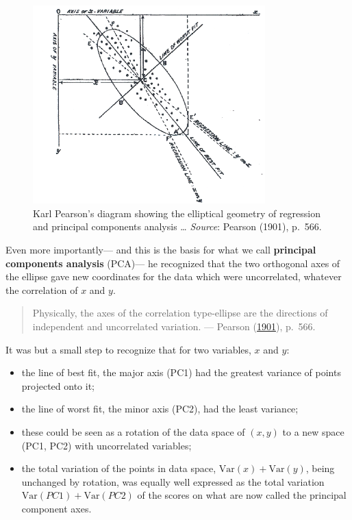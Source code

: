 \documentclass[
  letterpaper,
  10pt,
  krantz2]{krantz}
\providecommand{\tightlist}{%
  \setlength{\itemsep}{0pt}\setlength{\parskip}{0pt}}\usepackage{longtable,booktabs,array}
\begin{document}
\begin{figure}

{\centering \includegraphics[width=0.8\textwidth,height=\textheight]{images/Pearson1901_2.png}

}

\caption{\label{fig-Pearson1901-2}Karl Pearson's diagram showing the
elliptical geometry of regression and principal components analysis
\ldots{} \emph{Source}: Pearson (1901), p.~566.}

\end{figure}

Even more importantly--- and this is the basis for what we call
\textbf{principal components analysis} (PCA)--- he recognized that the
two orthogonal axes of the ellipse gave new coordinates for the data
which were uncorrelated, whatever the correlation of \(x\) and \(y\).

\begin{quote}
Physically, the axes of the correlation type-ellipse are the directions
of independent and uncorrelated variation. --- Pearson
(\protect\hyperlink{ref-Pearson:1901}{1901}), p.~566.
\end{quote}

It was but a small step to recognize that for two variables, \(x\) and
\(y\):

\begin{itemize}
\tightlist
\item
  the line of best fit, the major axis (PC1) had the greatest variance
  of points projected onto it;
\item
  the line of worst fit, the minor axis (PC2), had the least variance;
\item
  these could be seen as a rotation of the data space of \((x, y)\) to a
  new space (PC1, PC2) with uncorrelated variables;
\item
  the total variation of the points in data space,
  \(\text{Var}(x) + \text{Var}(y)\), being unchanged by rotation, was
  equally well expressed as the total variation
  \(\text{Var}(PC1) + \text{Var}(PC2)\) of the scores on what are now
  called the principal component axes.
\end{itemize}
\end{document}
